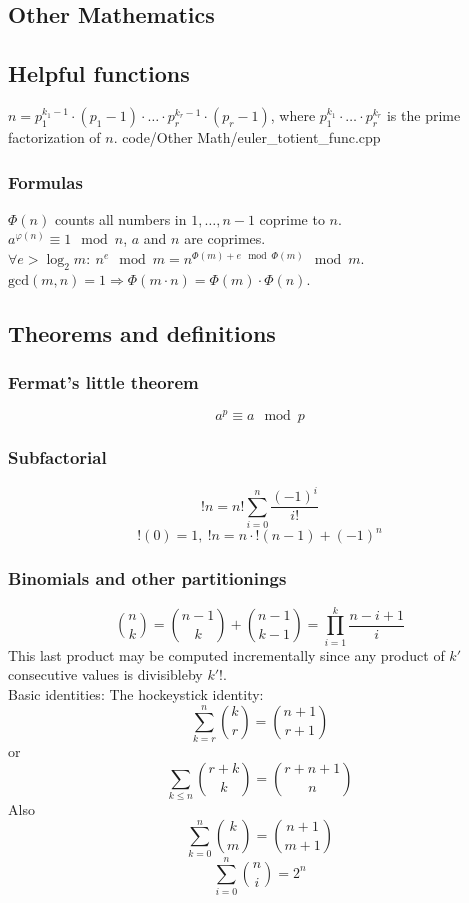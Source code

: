 \documentclass[
	a4paper,
	landscape,
	10pt,
]{article}
\begin{document}
\begin{multicols}{3}
\section{Other Mathematics}
	\subsection{Helpful functions}
		{
			$n = p_1^{k_1-1}\cdot(p_1-1) \cdot \hdots \cdot p_r^{k_r-1}\cdot(p_r-1)$, where $p_1^{k_1} \cdot \hdots \cdot p_r^{k_r}$ is the prime factorization of $n$.
		}
		{code/Other Math/euler_totient_func.cpp}
		\subsubsection*{Formulas}
			$\Phi(n)$ counts all numbers in ${1,\hdots,n-1}$ coprime to $n$. \\
			$a^{\varphi (n)} \equiv 1 \mod n$, $a$ and $n$ are coprimes. \\
			$\forall e > \log_2 m:~ n^e \mod m = n^{\Phi(m) + e \mod \Phi(m)} \mod m$. \\
			$\text{gcd}(m,n) = 1 \Rightarrow \Phi(m\cdot n) = \Phi(m) \cdot \Phi(n)$. \\


	\newpage
	\subsection{Theorems and definitions}
		\subsubsection*{Fermat's little theorem}
		$$a^p \equiv a \mod p$$
		\subsubsection*{Subfactorial}
		$$!n = n! \sum_{i=0}^{n} \frac{(-1)^i}{i!}$$
		$$!(0) = 1, ~ !n = n \cdot !(n-1) + (-1)^n$$

		\subsubsection*{Binomials and other partitionings}
		$$\binom{n}{k} = \binom{n-1}{k}+\binom{n-1}{k-1} =
			\prod_{i=1}^k \frac{n-i+1}{i}$$ This last product may be computed
		incrementally since any product of $k'$ consecutive values is divisibleby
		$k'!$. \\
		Basic identities: The hockeystick identity: \\
		 $$\sum_{k=r}^n \binom{k}{r}
			= \binom{n+1}{r+1}$$
		or $$\sum_{k\leq n}\binom{r+k}{k} = \binom{r+n+1}{n}$$
		Also $$\sum_{k=0}^n \binom{k}{m} = \binom{n+1}{m+1}$$
		$$\sum_{i=0}^{n} \binom{n}{i} = 2^n$$


\end{multicols}
\end{document}
